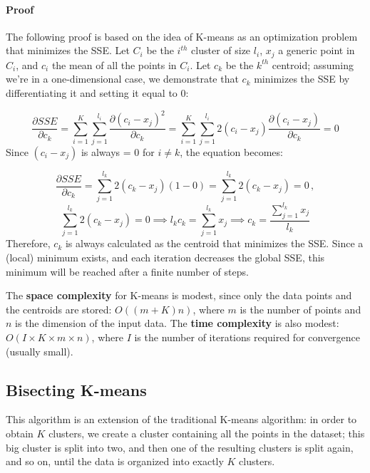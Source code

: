 \paragraph{Proof}

The following proof is based on the idea of K-means as an optimization problem that minimizes the SSE. Let $C_i$ be the $i^{th}$ cluster of size $l_i$, $x_j$ a generic point in $C_i$, and $c_i$ the mean of all the points in $C_i$. Let $c_k$ be the $k^{th}$ centroid; assuming we're in a one-dimensional case, we demonstrate that $c_k$ minimizes the SSE by differentiating it and setting it equal to 0:

\begin{equation*}
    \dfrac{\partial SSE}{\partial c_k} = \sum_{i=1}^K \sum_{j = 1}^{l_i} \dfrac{\partial (c_i - x_j)^2}{\partial c_k} = \sum_{i=1}^K \sum_{j = 1}^{l_i} 2(c_i - x_j) \dfrac{\partial (c_i - x_j)}{\partial c_k} = 0
\end{equation*}
Since $(c_i - x_j)$ is always = 0 for $i \neq k$, the equation becomes:

\begin{equation*}
    \dfrac{\partial SSE}{\partial c_k} = \sum_{j = 1}^{l_k} 2(c_k - x_j) (1 - 0) = \sum_{j = 1}^{l_k} 2(c_k - x_j) = 0 \, ,
\end{equation*}
\begin{equation*}
    \sum_{j = 1}^{l_k} 2 (c_k - x_j) = 0 \implies l_k c_k = \sum_{j = 1}^{l_k} x_j \implies c_k = \dfrac{\sum_{j = 1}^{l_k} x_j}{l_k}
\end{equation*}
Therefore, $c_k$ is always calculated as the centroid that minimizes the SSE. Since a (local) minimum exists, and each iteration decreases the global SSE, this minimum will be reached after a finite number of steps.

The \textbf{space complexity} for K-means is modest, since only the data points and the centroids are stored: $O((m + K)n)$, where $m$ is the number of points and $n$ is the dimension of the input data. The \textbf{time complexity} is also modest: $O(I \times K \times m \times n)$, where $I$ is the number of iterations required for convergence (usually small).

\subsection{Bisecting K-means}

This algorithm is an extension of the traditional K-means algorithm: in order to obtain $K$ clusters, we create a cluster containing all the points in the dataset; this big cluster is split into two, and then one of the resulting clusters is split again, and so on, until the data is organized into exactly $K$ clusters.

